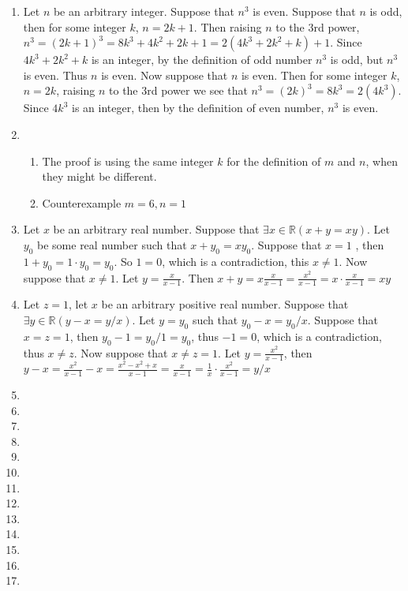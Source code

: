 \begin{enumerate}
    \item
    Let $n$ be an arbitrary integer. Suppose that $n^3$ is even. Suppose that $n$ is odd, then for some integer $k$, $n = 2k + 1$. Then raising $n$ to the 3rd power, $n^3 = (2k + 1)^3 = 8k^3 + 4k^2 + 2k + 1 = 2(4k^3 + 2k^2 + k) + 1$. Since $4k^3 + 2k^2 + k$ is an integer, by the definition of odd number $n^3$ is odd, but $n^3$ is even. Thus $n$ is even.
    Now suppose that $n$ is even. Then for some integer $k$, $n = 2k$, raising $n$ to the 3rd power we see that $n^3 = (2k)^3 = 8k^3 = 2(4k^3)$. Since $4k^3$ is an integer, then by the definition of even number, $n^3$ is even.
    \item
    \begin{enumerate}
        \item
    The proof is using the same integer $k$ for the definition of $m$ and $n$, when they might be different.
        \item 
    Counterexample $m = 6, n = 1$
    \end{enumerate}
    \item
    Let $x$ be an arbitrary real number. Suppose that $\exists x \in \mathbb{R}(x + y = xy)$. Let $y_0$ be some real number such that $x + y_0 = xy_0$. Suppose that $x = 1$ , then $1 + y_0 = 1 \cdot y_0 = y_0$. So $1 = 0$, which is a contradiction, this $x \neq 1$.
    Now suppose that $x \neq 1$. Let $y = \frac{x}{x - 1}$. Then $x + y = x \frac{x}{x - 1} = \frac{x^2}{x -1} = x \cdot \frac{x}{x - 1} = xy$
    \item
    Let $z = 1$, let $x$ be an arbitrary positive real number. Suppose that $\exists y \in \mathbb{R}(y - x = y / x)$. Let $y = y_0$ such that $y_0 - x = y_0 / x$. Suppose that $x = z = 1$, then $y_0 - 1 = y_0 / 1 = y_0$, thus $-1 = 0$, which is a contradiction, thus $x \neq z$. 
    Now suppose that $x \neq z = 1$. Let $y = \frac{x^2}{x - 1}$, then $y - x = \frac{x^2}{x - 1} - x = \frac{x^2 - x^2 + x}{x - 1} = \frac{x}{x - 1} = \frac{1}{x} \cdot \frac{x^2}{x - 1} = y/x$
    \item
    
    \item
    \item
    \item
    \item
    \item
    \item
    \item
    \item
    \item
    \item
    \item
    \item
\end{enumerate}
